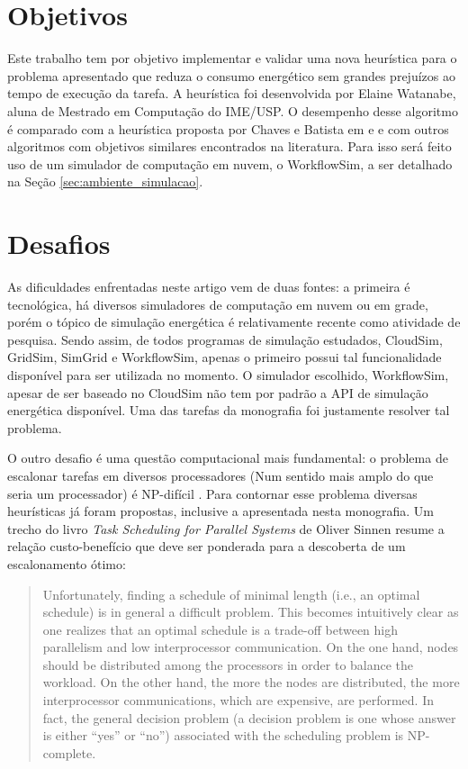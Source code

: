 \section{Objetivos}
\label{sec:objetivos}
Este trabalho tem por objetivo implementar e validar uma nova heurística para o
problema apresentado que reduza o consumo energético sem grandes prejuízos
ao tempo de execução da tarefa. A heurística foi desenvolvida por Elaine Watanabe, 
aluna de Mestrado em Computação do IME/USP. O desempenho desse algoritmo é
comparado com a heurística proposta por Chaves e Batista em
\cite{chaves:scheduling_software_requirements} e
\cite{batista:embedding_software_requirements} e com outros algoritmos com
objetivos similares encontrados na literatura. Para isso será feito uso de um
simulador de computação em nuvem, o WorkflowSim, a ser detalhado na Seção
\ref{sec:ambiente_simulacao}.


\section{Desafios}
\label{sec:desafios}
As dificuldades enfrentadas neste artigo vem de duas fontes: a primeira é
tecnológica, há diversos simuladores de computação em nuvem ou em grade, porém
o tópico de simulação energética é relativamente recente como atividade de 
pesquisa. Sendo assim, de todos programas de simulação estudados, CloudSim, 
GridSim, SimGrid e WorkflowSim, apenas o primeiro possui tal funcionalidade
disponível para ser utilizada no momento. O simulador escolhido, WorkflowSim,
apesar de ser baseado no CloudSim  não tem por padrão a API de simulação energética
disponível. Uma das tarefas da monografia foi justamente resolver tal problema.

O outro desafio é uma questão computacional mais fundamental: o problema de 
escalonar tarefas em diversos processadores (Num sentido mais amplo do que seria
um processador) é NP-difícil \cite{sinnen:task_scheduling_parallel_systems}.
Para contornar esse problema diversas heurísticas já foram propostas, inclusive
a apresentada nesta monografia. Um trecho do livro
\emph{Task Scheduling for Parallel Systems} de Oliver Sinnen resume a relação
custo-benefício que deve ser ponderada para a descoberta de um escalonamento
ótimo:

\begin{quote}
Unfortunately, finding a schedule of minimal length (i.e., an optimal schedule)
is in general a difficult problem. This becomes intuitively clear as one realizes that
an optimal schedule is a trade-off between high parallelism and low interprocessor
communication. On the one hand, nodes should be distributed among the processors
in order to balance the workload. On the other hand, the more the nodes are distributed,
the more interprocessor communications, which are expensive, are performed. In fact,
the general decision problem (a decision problem is one whose answer is either ``yes''
or ``no'') associated with the scheduling problem is NP-complete. 
\cite{sinnen:task_scheduling_parallel_systems}
\end{quote}



